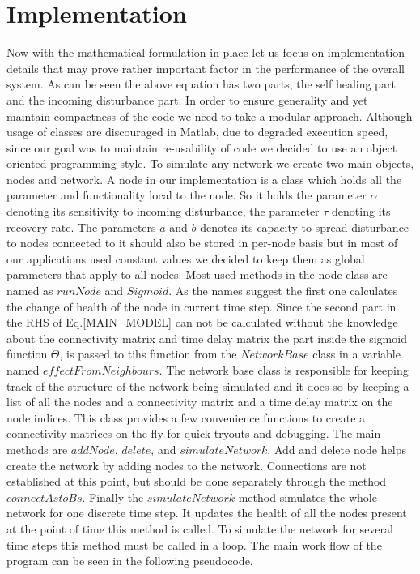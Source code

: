 \documentclass[11pt]{article}
\begin{document}
\section{Implementation}
Now with the mathematical formulation in place let us focus on implementation details that may prove rather important factor in the performance of the overall system. As can be seen the above equation has two parts, the self healing part and the incoming disturbance part. In order to ensure generality and yet maintain compactness of the code we need to take a modular approach. Although usage of classes are discouraged in Matlab, due to degraded execution speed, since our goal was to maintain re-usability of code we decided to use an object oriented programming style. To simulate any network we create two main objects, nodes and network. A node in our implementation is a class which holds all the parameter and functionality local to the node. So it holds the parameter $\alpha$ denoting its sensitivity to incoming disturbance, the parameter $\tau$ denoting its recovery rate. The parameters $a$ and $b$ denotes its capacity to spread disturbance to nodes connected to it should also be stored in per-node basis but in most of our applications used constant values we decided to keep them as global parameters that apply to all nodes. Most used methods in the node class are named as $runNode$ and $Sigmoid$. As the names suggest the first one calculates the change of health of the node in current time step. Since the second part in the RHS of Eq.\ref{MAIN_MODEL} can not be calculated without the knowledge about the connectivity matrix and time delay matrix the part inside the sigmoid function $\Theta$, is passed to tihs function from the $NetworkBase$ class in a variable named $effectFromNeighbours$. The network base class is responsible for keeping track of the structure of the network being simulated and it does so by keeping a list of all the nodes and a connectivity matrix and a time delay matrix on the node indices. This class provides a few convenience functions to create a connectivity matrices on the fly for quick tryouts and debugging. The main methods are $addNode$, $delete$, and $simulateNetwork$. Add and delete node helps create the network by adding nodes to the network. Connections are not established at this point, but should be done separately through the method $connectAstoBs$. Finally the $simulateNetwork$ method simulates the whole network for one discrete time step. It updates the health of all the nodes present at the point of time this method is called. To simulate the network for several time steps this method must be called in a loop. The main work flow of the program can be seen in the following pseudocode.
\end{document}
